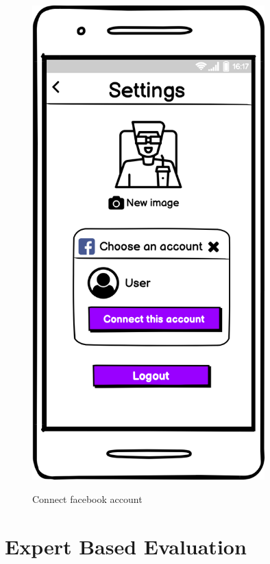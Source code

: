 \documentclass[12pt, a4paper]{article}
\numberwithin{figure}{section}
\begin{document}
\begin{center}
\begin{minipage}{0.3\textwidth}
\begin{figure}[H]
			\includegraphics[width=0.8\textwidth]{images/mockups/User setting facebook.png}\\
			\caption{Connect facebook account}
		\end{figure}
	\end{minipage}	
\end{center}


\newpage

\section{Expert Based Evaluation}
\end{document}
